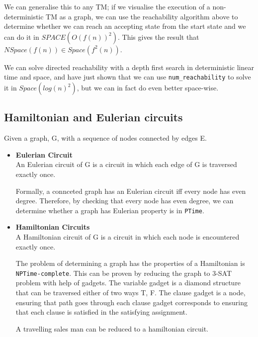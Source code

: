 We can generalise this to any TM; if we visualise the execution of a non-
deterministic TM as a graph, we can use the reachability algorithm above to
determine whether we can reach an accepting state from the start state and we
can do it in $SPACE(O(f(n))^2)$. This gives the result that $NSpace(f(n)) \in
Space(f^2(n))$.

We can solve directed reachability with a depth first search in deterministic
linear time and space, and have just shown that we can use
\texttt{num\_reachability} to solve it in $Space(log(n)^2)$, but we can in fact
do even better space-wise.


\subsection{Hamiltonian and Eulerian circuits}

Given a graph, G, with a sequence of nodes connected by edges E. 
\begin{itemize}
\item{\textbf{Eulerian Circuit}}\\
An Eulerian circuit of G is a circuit in which each edge of G is traversed exactly once.

Formally, a connceted graph has an Eulerian circuit iff every node has even degree.
Therefore, by checking that every node has even degree, we can determine 
whether a graph has Eulerian property is in \texttt{PTime}.

\item{\textbf{Hamiltonian Circuits}}\\
A Hamiltonian circuit of G is a circuit in which each node is encountered exactly once.

The problem of determining a graph has the properties of a Hamiltonian is \texttt{NPTime-complete}.
This can be proven by reducing the graph to 3-SAT problem with help of gadgets. 
The variable gadget is a diamond structure that can be traversed either of two ways {T, F}. 
The clause gadget is a node, ensuring that path goes through each clause gadget corresponds
to ensuring that each clause is satisfied in the satisfying assignment.


A travelling sales man can be reduced to a hamiltonian circuit. 
\end{itemize}


